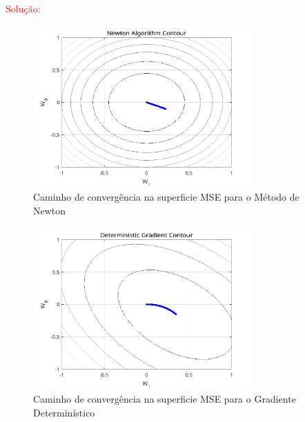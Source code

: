 \documentclass[a4paper,10pt]{article}
\begin{document}
\begin{enumerate}
\begin{enumerate}
						\textcolor{red}{Solução:}

				\end{enumerate}
				
				\newpage
				\begin{figure}[!ht]
					\centering
					\includegraphics[width=0.75\textwidth]{figs/newton_contour.png}
					\caption{Caminho de convergência na superficie MSE para o Método de Newton}
					\label{fig:newton_contour}
				\end{figure}
				
				\begin{figure}[!ht]
					\centering
					\includegraphics[width=0.75\textwidth]{figs/gradient_contour.png}
					\caption{Caminho de convergência na superficie MSE para o Gradiente Determinístico}
					\label{fig:gradient_contour}
				\end{figure}


\end{enumerate}
\end{document}
